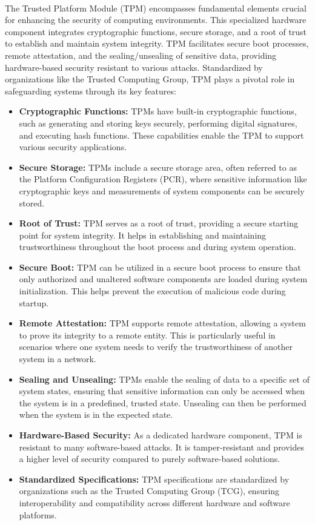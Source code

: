 \paragraph*{}
The Trusted Platform Module (TPM) encompasses fundamental elements crucial for enhancing the security of computing environments. This specialized hardware component integrates cryptographic functions, secure storage, and a root of trust to establish and maintain system integrity. TPM facilitates secure boot processes, remote attestation, and the sealing/unsealing of sensitive data, providing hardware-based security resistant to various attacks. Standardized by organizations like the Trusted Computing Group, TPM plays a pivotal role in safeguarding systems through its key features:
\begin{itemize}
	\item \textbf{Cryptographic Functions:} TPMs have built-in cryptographic functions, such as generating and storing keys securely, performing digital signatures, and executing hash functions. These capabilities enable the TPM to support various security applications.
	\item \textbf{Secure Storage:} TPMs include a secure storage area, often referred to as the Platform Configuration Registers (PCR), where sensitive information like cryptographic keys and measurements of system components can be securely stored.
	\item \textbf{Root of Trust:} TPM serves as a root of trust, providing a secure starting point for system integrity. It helps in establishing and maintaining trustworthiness throughout the boot process and during system operation.
	\item \textbf{Secure Boot:} TPM can be utilized in a secure boot process to ensure that only authorized and unaltered software components are loaded during system initialization. This helps prevent the execution of malicious code during startup.
	\item \textbf{Remote Attestation:} TPM supports remote attestation, allowing a system to prove its integrity to a remote entity. This is particularly useful in scenarios where one system needs to verify the trustworthiness of another system in a network.
	\item \textbf{Sealing and Unsealing:} TPMs enable the sealing of data to a specific set of system states, ensuring that sensitive information can only be accessed when the system is in a predefined, trusted state. Unsealing can then be performed when the system is in the expected state.
	\item \textbf{Hardware-Based Security:} As a dedicated hardware component, TPM is resistant to many software-based attacks. It is tamper-resistant and provides a higher level of security compared to purely software-based solutions.
	\item \textbf{Standardized Specifications:} TPM specifications are standardized by organizations such as the Trusted Computing Group (TCG), ensuring interoperability and compatibility across different hardware and software platforms.
\end{itemize}
